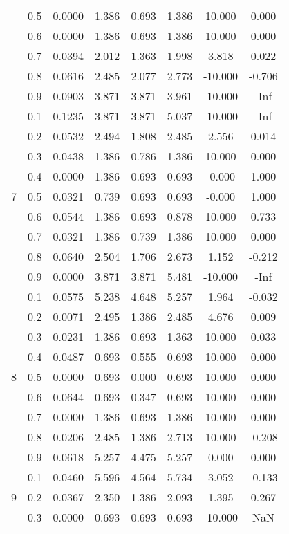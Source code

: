 \documentclass[11pt,a4paper]{report}
\begin{document}
\begin{longtable}{ | c | c || c | c | c | c | c | c | }
 & 0.5 & 0.0000 & 1.386 & 0.693 & 1.386 & 10.000 & 0.000 \\
 & 0.6 & 0.0000 & 1.386 & 0.693 & 1.386 & 10.000 & 0.000 \\
 & 0.7 & 0.0394 & 2.012 & 1.363 & 1.998 & 3.818 & 0.022 \\
 & 0.8 & 0.0616 & 2.485 & 2.077 & 2.773 & -10.000 & -0.706 \\
 & 0.9 & 0.0903 & 3.871 & 3.871 & 3.961 & -10.000 & -Inf \\
 \hline
\multirow{9}{*}{7} & 0.1 & 0.1235 & 3.871 & 3.871 & 5.037 & -10.000 & -Inf \\
 & 0.2 & 0.0532 & 2.494 & 1.808 & 2.485 & 2.556 & 0.014 \\
 & 0.3 & 0.0438 & 1.386 & 0.786 & 1.386 & 10.000 & 0.000 \\
 & 0.4 & 0.0000 & 1.386 & 0.693 & 0.693 & -0.000 & 1.000 \\
 & 0.5 & 0.0321 & 0.739 & 0.693 & 0.693 & -0.000 & 1.000 \\
 & 0.6 & 0.0544 & 1.386 & 0.693 & 0.878 & 10.000 & 0.733 \\
 & 0.7 & 0.0321 & 1.386 & 0.739 & 1.386 & 10.000 & 0.000 \\
 & 0.8 & 0.0640 & 2.504 & 1.706 & 2.673 & 1.152 & -0.212 \\
 & 0.9 & 0.0000 & 3.871 & 3.871 & 5.481 & -10.000 & -Inf \\
 \hline
\multirow{9}{*}{8} & 0.1 & 0.0575 & 5.238 & 4.648 & 5.257 & 1.964 & -0.032 \\
 & 0.2 & 0.0071 & 2.495 & 1.386 & 2.485 & 4.676 & 0.009 \\
 & 0.3 & 0.0231 & 1.386 & 0.693 & 1.363 & 10.000 & 0.033 \\
 & 0.4 & 0.0487 & 0.693 & 0.555 & 0.693 & 10.000 & 0.000 \\
 & 0.5 & 0.0000 & 0.693 & 0.000 & 0.693 & 10.000 & 0.000 \\
 & 0.6 & 0.0644 & 0.693 & 0.347 & 0.693 & 10.000 & 0.000 \\
 & 0.7 & 0.0000 & 1.386 & 0.693 & 1.386 & 10.000 & 0.000 \\
 & 0.8 & 0.0206 & 2.485 & 1.386 & 2.713 & 10.000 & -0.208 \\
 & 0.9 & 0.0618 & 5.257 & 4.475 & 5.257 & 0.000 & 0.000 \\
 \hline
\multirow{9}{*}{9} & 0.1 & 0.0460 & 5.596 & 4.564 & 5.734 & 3.052 & -0.133 \\
 & 0.2 & 0.0367 & 2.350 & 1.386 & 2.093 & 1.395 & 0.267 \\
 & 0.3 & 0.0000 & 0.693 & 0.693 & 0.693 & -10.000 & NaN \\

\end{longtable}
\end{document}
